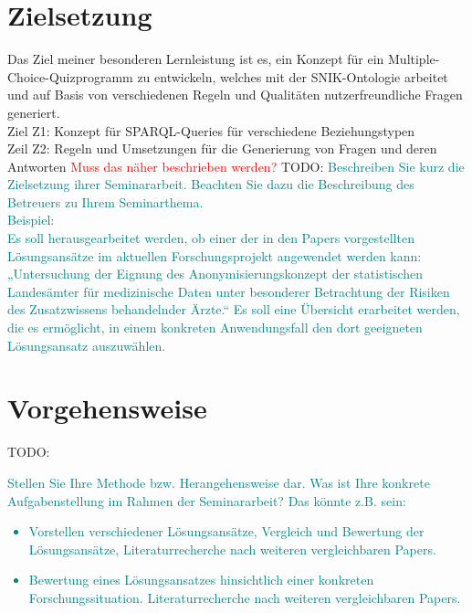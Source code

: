 \documentclass[headsepline,titlepage,ngerman,twoside,12pt]{report}
\newcommand\idea[1]{\textcolor{red}{#1}}
\newcommand\todo[1]{TODO: \textcolor{teal}{#1}}
\begin{document}
\section{Zielsetzung}
Das Ziel meiner besonderen Lernleistung ist es, ein Konzept für ein Multiple-Choice-Quizprogramm zu entwickeln, welches mit der SNIK-Ontologie arbeitet und auf Basis von verschiedenen Regeln und Qualitäten nutzerfreundliche Fragen generiert. 
\\Ziel Z1:  Konzept für SPARQL-Queries für verschiedene Beziehungstypen 
\\Zeil Z2:  Regeln und Umsetzungen für die Generierung von Fragen und deren Antworten
\idea{Muss das näher beschrieben werden?}
\todo{
Beschreiben Sie kurz die Zielsetzung ihrer Seminararbeit.
Beachten Sie dazu die Beschreibung des Betreuers zu Ihrem Seminarthema.\\
Beispiel:\\
Es soll herausgearbeitet werden, ob einer der in den Papers vorgestellten Lösungsansätze im aktuellen Forschungsprojekt angewendet werden kann: „Untersuchung der Eignung des Anonymisierungskonzept der statistischen Landesämter für medizinische Daten unter besonderer Betrachtung der Risiken des Zusatzwissens behandelnder Ärzte.“
Es soll eine Übersicht erarbeitet werden, die es ermöglicht, in einem konkreten Anwendungsfall den dort geeigneten Lösungsansatz auszuwählen.
}

\section{Vorgehensweise}
\todo{
Stellen Sie Ihre Methode bzw. Herangehensweise dar.
Was ist Ihre konkrete Aufgabenstellung im Rahmen der Seminararbeit? Das könnte z.B. sein:
\begin{itemize}
\item Vorstellen verschiedener Lösungsansätze, Vergleich und Bewertung der Lösungsansätze, Literaturrecherche nach weiteren vergleichbaren Papers.
\item Bewertung eines Lösungsansatzes hinsichtlich einer konkreten Forschungssituation.
Literaturrecherche nach weiteren vergleichbaren Papers.
\end{itemize}
}
\end{document}
